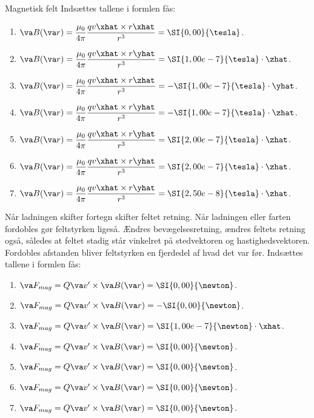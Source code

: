 \begin{opgave}{Magnetisk felt}
    \opg Indsættes tallene i formlen fås:
    \begin{enumerate}
        \item $\va B(\va r) = \dfrac{\mu_0}{4\pi}\dfrac{qv\xhat \times r\xhat}{r^3} = \SI{0,00}{\tesla}$.
        \item $\va B(\va r) = \dfrac{\mu_0}{4\pi}\dfrac{qv\xhat \times r\yhat}{r^3} = \SI{1,00e-7}{\tesla}\cdot \zhat$.
        \item $\va B(\va r) = \dfrac{\mu_0}{4\pi}\dfrac{qv\xhat \times r\zhat}{r^3} = -\SI{1,00e-7}{\tesla}\cdot \yhat$.
        \item $\va B(\va r) = \dfrac{\mu_0}{4\pi}\dfrac{qv\xhat \times r\yhat}{r^3} = -\SI{1,00e-7}{\tesla}\cdot \zhat$.
        \item $\va B(\va r) = \dfrac{\mu_0}{4\pi}\dfrac{qv\xhat \times r\yhat}{r^3} = \SI{2,00e-7}{\tesla}\cdot \zhat$.
        \item $\va B(\va r) = \dfrac{\mu_0}{4\pi}\dfrac{qv\xhat \times r\yhat}{r^3} = \SI{2,00e-7}{\tesla}\cdot \zhat$.
        \item $\va B(\va r) = \dfrac{\mu_0}{4\pi}\dfrac{qv\xhat \times r\yhat}{r^3} = \SI{2,50e-8}{\tesla}\cdot \zhat$.
    \end{enumerate}
    \opg Når ladningen skifter fortegn skifter feltet retning. Når ladningen eller farten fordobles gør feltstyrken ligeså. Ændres bevægelsesretning, ændres feltets retning også, således at feltet stadig står vinkelret på stedvektoren og hastighedsvektoren. Fordobles afstanden bliver feltstyrken en fjerdedel af hvad det var før.
    \opg Indsættes tallene i formlen fås:
    \begin{enumerate}
        \item $\va F_{mag} = Q\va v' \times \va B(\va r) = \SI{0,00}{\newton}$.
        \item $\va F_{mag} = Q\va v' \times \va B(\va r) = -\SI{0,00}{\newton}$.
        \item $\va F_{mag} = Q\va v' \times \va B(\va r) = \SI{1,00e-7}{\newton}\cdot \xhat$.
        \item $\va F_{mag} = Q\va v' \times \va B(\va r) = \SI{0,00}{\newton}$.
        \item $\va F_{mag} = Q\va v' \times \va B(\va r) = \SI{0,00}{\newton}$.
        \item $\va F_{mag} = Q\va v' \times \va B(\va r) = \SI{0,00}{\newton}$.
        \item $\va F_{mag} = Q\va v' \times \va B(\va r) = \SI{0,00}{\newton}$.

\end{enumerate}
\end{opgave}
